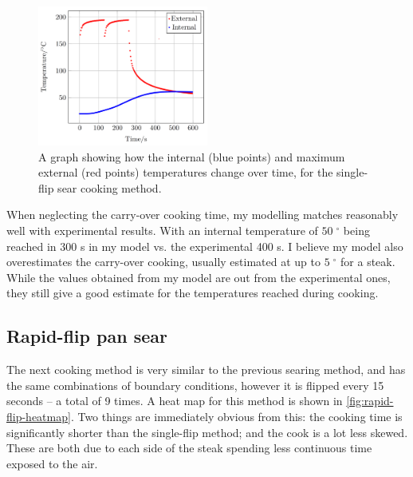 \documentclass[11pt]{article}
\begin{document}
	\begin{figure}[H]
		\centering
		\includegraphics[width=0.5\textwidth]{./img/temps-single-sear.png}
		\caption{A graph showing how the internal (blue points) and maximum external (red points) temperatures change over time, for the single-flip sear cooking method.}
		\label{fig:single-flip-temps}
	\end{figure}
	
	When neglecting the carry-over cooking time, my modelling matches reasonably well with experimental results\cite{steak_modelling}. With an internal temperature of $50\; ^\circ$ being reached in 300 s in my model vs. the experimental 400 s. I believe my model also overestimates the carry-over cooking, usually estimated at up to $5\; ^\circ$ for a steak\cite{carryover}. While the values obtained from my model are out from the experimental ones, they still give a good estimate for the temperatures reached during cooking.
	
	\subsection{Rapid-flip pan sear}
	
	The next cooking method is very similar to the previous searing method, and has the same combinations of boundary conditions, however it is flipped every 15 seconds -- a total of 9 times. A heat map for this method is shown in \autoref{fig:rapid-flip-heatmap}. Two things are immediately obvious from this: the cooking time is significantly shorter than the single-flip method; and the cook is a lot less skewed. These are both due to each side of the steak spending less continuous time exposed to the air.
	
\end{document}
